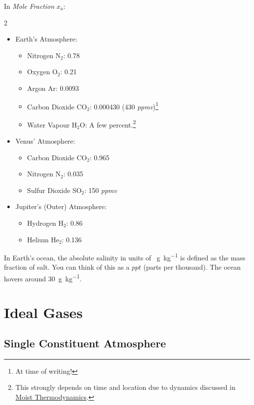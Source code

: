 In \textit{Mole Fraction} \(x_a\):
\begin{multicols}{2}
\begin{itemize}
    \item Earth's Atmosphere: 
    \begin{itemize}
        \item Nitrogen N\(_2\): 0.78
        \item Oxygen O\(_2\): 0.21
        \item Argon Ar: 0.0093
        \item Carbon Dioxide CO\(_2\): 0.000430 (430 \textit{ppmv})\footnote{At time of writing!}
        \item Water Vapour H\(_2\)O: A few percent.\footnote{This strongly depends on time and location due to dynamics discussed in \hyperref[Moist Thermodynamics]{Moist Thermodynamics}.}
    \end{itemize}
    \item  Venus' Atmosphere:
    \begin{itemize}
        \item Carbon Dioxide CO\(_2\): 0.965
        \item Nitrogen N\(_2\): 0.035
        \item Sulfur Dioxide SO\(_2\): 150 \textit{ppmv}
    \end{itemize}
    \item  Jupiter's (Outer) Atmosphere:
    \begin{itemize}
        \item Hydrogen H\(_2\): 0.86
        \item Helium He\(_2\): 0.136
    \end{itemize}
\end{itemize}
\end{multicols}
In Earth's ocean, the absolute salinity in units of \qty{}{\gram\per\kilogram} is defined as the mass fraction of salt. You can think of this as a \(ppt\) (parts per thousand). The ocean hovers around \qty{30}{\gram\per\kilogram}.

\section{Ideal Gases}

\subsection{Single Constituent Atmosphere}

